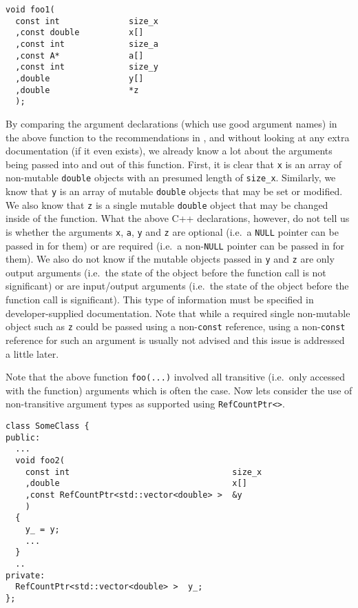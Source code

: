 {\scriptsize\begin{verbatim}
void foo1(
  const int              size_x
  ,const double          x[]
  ,const int             size_a
  ,const A*              a[]
  ,const int             size_y
  ,double                y[]
  ,double                *z
  );
\end{verbatim}}

By comparing the argument declarations (which use good argument names)
in the above function to the recommendations in {}\cite[Appendix
D]{ref:RefCountPtrBeginnersGuide}, and without looking at any extra
documentation (if it even exists), we already know a lot about the
arguments being passed into and out of this function.  First, it is
clear that {}\texttt{x} is an array of non-mutable {}\texttt{double}
objects with an presumed length of {}\texttt{size\_x}.  Similarly, we
know that {}\texttt{y} is an array of mutable {}\texttt{double}
objects that may be set or modified.  We also know that {}\texttt{z}
is a single mutable {}\texttt{double} object that may be changed
inside of the function.  What the above C++ declarations, however, do
not tell us is whether the arguments {}\texttt{x}, {}\texttt{a},
{}\texttt{y} and {}\texttt{z} are optional (i.e.~a {}\texttt{NULL}
pointer can be passed in for them) or are required (i.e.~a
non-{}\texttt{NULL} pointer can be passed in for them).  We also do
not know if the mutable objects passed in {}\texttt{y} and
{}\texttt{z} are only output arguments (i.e.~the state of the object
before the function call is not significant) or are input/output
arguments (i.e.~the state of the object before the function call is
significant).  This type of information must be specified in
developer-supplied documentation.  Note that while a required single
non-mutable object such as {}\texttt{z} could be passed using a
non-{}\texttt{const} reference, using a non-{}\texttt{const} reference
for such an argument is usually not advised and this issue is
addressed a little later.

Note that the above function {}\texttt{foo(...)} involved all
transitive (i.e.~only accessed with the function) arguments which is
often the case.  Now lets consider the use of non-transitive argument
types as supported using {}\texttt{Ref\-Count\-Ptr<>}.

{\scriptsize\begin{verbatim}
class SomeClass {
public:
  ...
  void foo2(
    const int                                 size_x
    ,double                                   x[]
    ,const RefCountPtr<std::vector<double> >  &y
    )
  {
    y_ = y;
    ...
  }
  ..
private:
  RefCountPtr<std::vector<double> >  y_;
};
\end{verbatim}}

